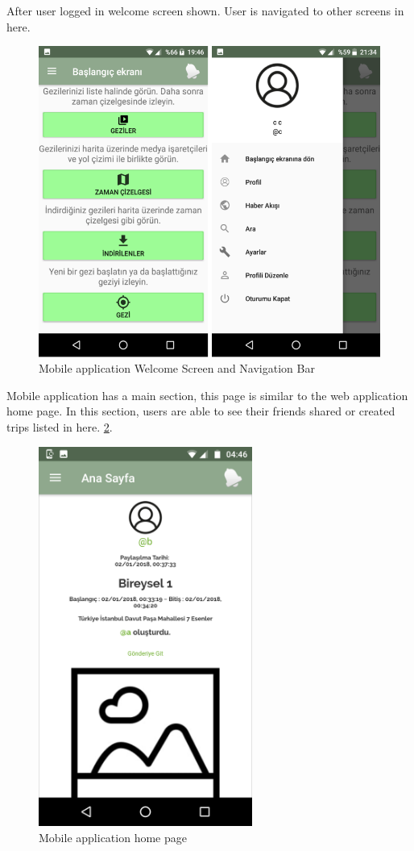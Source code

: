 \newpage
After user logged in welcome screen shown. User is navigated to other screens in here. 

\begin{figure}[!htbp]
\centering
\includegraphics[width=\textwidth]{projectChapters/images/baslangic.png}
\caption{Mobile application Welcome Screen and Navigation Bar}
\label{fig:phoneLogin}
\end{figure}


\newpage

Mobile application has a main section, this page is similar to the web application home page. In this section, users are able to see their friends shared or created trips listed in here.  
\ref{fig:phoneHome}.

\begin{figure}[!htbp]
\centering
\includegraphics[width=70mm,scale=0.7]{projectChapters/images/phoneHome.png}
\caption{Mobile application home page}
\label{fig:phoneHome}
\end{figure}

